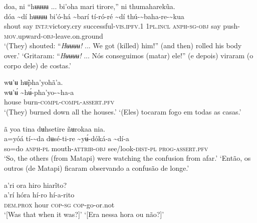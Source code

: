 \documentclass[output=paper,
modfonts,nonflat
]{langsci/langscibook}
\begin{document}
 
\ea doa, ni “hʉʉʉʉ ... bi'oha mari tirore,” ni thumaharekũa. \\[.3em]
\gll dóa	{\textasciitilde}dí	hʉʉʉʉ bi'ó-há	{\textasciitilde}barí	tí-ró-ré {\textasciitilde}dí	thú-{\textasciitilde}baha-re-{\textasciitilde}kua \\
     shout	say	\textsc{intj:}victory.cry	successful-\textsc{vis.ipfv.}1	1\textsc{pl.incl}	\textsc{anph-sg-obj} say	push-\textsc{mov.}upward\textsc{-obj}-leave.on.ground \\
\glt ‘(They) shouted: “\textit{Hʉʉʉʉ!} ... We got (killed) him!” (and then) rolled his body over.'
\glt ‘Gritaram: “\textit{Hʉʉʉʉ!} ... Nós conseguimos (matar) ele!” (e depois) viraram (o corpo dele) de costas.'
\z 

\ea wʉ'ʉ hʉ̃pha'yohã'a. \\[.3em]
\gll wʉ'ʉ́	{\textasciitilde}hʉ́-pha'yo-{\textasciitilde}ha-a  \\
     house	burn-\textsc{compl-compl-assert.pfv} \\
\glt ‘(They) burned down all the houses.’
\glt ‘(Eles) tocaram fogo em todas as casas.’
\z 

\ea ã yoa tina dʉhsetire ñʉrokaa nia. \\[.3em]
\gll {\textasciitilde}a=yóá	tí-{\textasciitilde}da	dʉsé-ti{\footnotemark}-re	{\textasciitilde}yʉ́-dóká-a	{\textasciitilde}dí-a \\
     so=do	\textsc{anph-pl}	mouth\textsc{-attrib-obj}	see/look-\textsc{dist-pl}	\textsc{prog-assert.pfv} \\
\glt ‘So, the others (from Matapi) were watching the confusion from afar.’
\glt ‘Então, os outros (de Matapi) ficaram observando a confusão de longe.’
\z 

\ea a’ri ora hiro hiarĩto?{\footnotemark} \\[.3em]
\gll a’rí	hóra	hí-ro	hí-a-rito \\
     \textsc{dem.prox}	hour	\textsc{cop-sg}	\textsc{cop-}go-or.not \\
\glt ‘[Was that when it was?]’ 
\glt ‘[Era nessa hora ou não?]’ 
\z 
\end{document}

